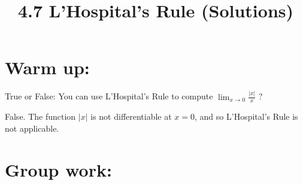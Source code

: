 \documentclass[nooutcomes]{ximera}
\title{4.7 L'Hospital's Rule (Solutions)}
\begin{document}
\begin{abstract}		\end{abstract}
\maketitle

\section*{Warm up:} 
True or False:  You can use L'Hospital's Rule to compute $\lim_{x \to 0} \frac{|x|}{x}$ ?
		\begin{freeResponse}
		False.  The function $|x|$ is not differentiable at $x=0$, and so L'Hospital's Rule is not applicable.
		\end{freeResponse}	
		
		
		

	
	
	
	
	

\section*{Group work:}
\end{document}
